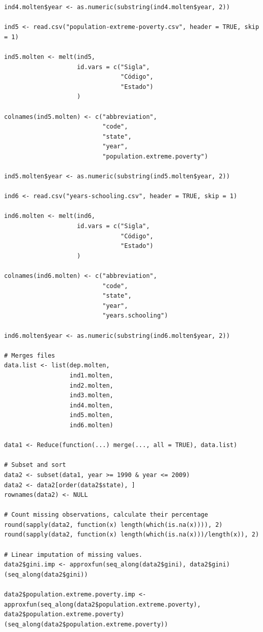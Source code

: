 \begin{verbatim}
ind4.molten$year <- as.numeric(substring(ind4.molten$year, 2))

ind5 <- read.csv("population-extreme-poverty.csv", header = TRUE, skip = 1)

ind5.molten <- melt(ind5,
                    id.vars = c("Sigla",
                                "Código",
                                "Estado")
                    )

colnames(ind5.molten) <- c("abbreviation",
                           "code",
                           "state",
                           "year",
                           "population.extreme.poverty")

ind5.molten$year <- as.numeric(substring(ind5.molten$year, 2))

ind6 <- read.csv("years-schooling.csv", header = TRUE, skip = 1)

ind6.molten <- melt(ind6,
                    id.vars = c("Sigla",
                                "Código",
                                "Estado")
                    )

colnames(ind6.molten) <- c("abbreviation",
                           "code",
                           "state",
                           "year",
                           "years.schooling")

ind6.molten$year <- as.numeric(substring(ind6.molten$year, 2))

# Merges files
data.list <- list(dep.molten,
                  ind1.molten,
                  ind2.molten,
                  ind3.molten,
                  ind4.molten,
                  ind5.molten,
                  ind6.molten)

data1 <- Reduce(function(...) merge(..., all = TRUE), data.list)

# Subset and sort
data2 <- subset(data1, year >= 1990 & year <= 2009)
data2 <- data2[order(data2$state), ]
rownames(data2) <- NULL

# Count missing observations, calculate their percentage
round(sapply(data2, function(x) length(which(is.na(x)))), 2)
round(sapply(data2, function(x) length(which(is.na(x)))/length(x)), 2)

# Linear imputation of missing values.
data2$gini.imp <- approxfun(seq_along(data2$gini), data2$gini)(seq_along(data2$gini))

data2$population.extreme.poverty.imp <- approxfun(seq_along(data2$population.extreme.poverty),
data2$population.extreme.poverty)(seq_along(data2$population.extreme.poverty))


\end{verbatim}
